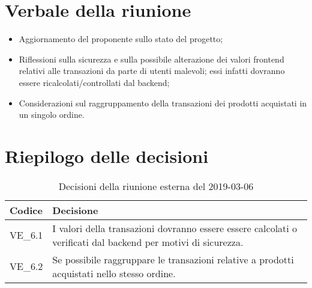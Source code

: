 \section{Verbale della riunione}
\begin{itemize}
	\item Aggiornamento del proponente sullo stato del progetto;
	\item Riflessioni sulla sicurezza e sulla possibile alterazione dei valori 
	frontend relativi alle transazioni da parte di utenti malevoli; essi 
	infatti dovranno essere ricalcolati/controllati dal backend;
	\item Considerazioni sul raggruppamento della transazioni dei prodotti 
	acquistati in un singolo ordine.
	

\end{itemize}

\hspace{3cm}

\section{Riepilogo delle decisioni}

	
	\begin{longtable}{ >{\centering}p{} >{}p{}}
		\caption{Decisioni della riunione esterna del 2019-03-06}\\	
		\rowcolorhead
		\textbf{\color{white}Codice} 
		& \centering\textbf{\color{white}Decisione} 
		\tabularnewline 
		\endfirsthead
		
		VE\_6.1 & I valori della transazioni dovranno essere essere calcolati o 
		verificati dal backend per motivi di sicurezza.
		\tabularnewline
		VE\_6.2 & Se possibile raggruppare le transazioni relative a prodotti 
		acquistati nello stesso ordine.
		
		
		
		
	\end{longtable}
	




